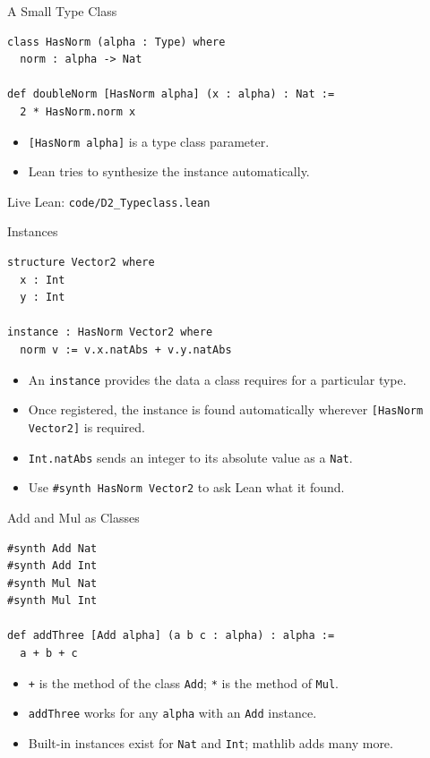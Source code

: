 ﻿\documentclass[aspectratio=169,11pt]{beamer}
\newcommand{\leanfile}[1]{\vfill{\small\color{gray}Live Lean: \texttt{#1}}}
\begin{document}
\begin{frame}[fragile]{A Small Type Class}
  \begin{lstlisting}
class HasNorm (alpha : Type) where
  norm : alpha -> Nat

def doubleNorm [HasNorm alpha] (x : alpha) : Nat :=
  2 * HasNorm.norm x
  \end{lstlisting}

  \begin{itemize}
    \item \texttt{[HasNorm alpha]} is a type class parameter.
    \item Lean tries to synthesize the instance automatically.
  \end{itemize}

  \leanfile{code/D2\_Typeclass.lean}
\end{frame}

\begin{frame}[fragile]{Instances}
  \begin{lstlisting}
structure Vector2 where
  x : Int
  y : Int

instance : HasNorm Vector2 where
  norm v := v.x.natAbs + v.y.natAbs
  \end{lstlisting}

  \begin{itemize}
    \item An \texttt{instance} provides the data a class requires for a particular type.
    \item Once registered, the instance is found automatically wherever \texttt{[HasNorm Vector2]} is required.
    \item \texttt{Int.natAbs} sends an integer to its absolute value as a \texttt{Nat}.
    \item Use \texttt{\#synth HasNorm Vector2} to ask Lean what it found.
  \end{itemize}
\end{frame}

\begin{frame}[fragile]{Add and Mul as Classes}
  \begin{lstlisting}
#synth Add Nat
#synth Add Int
#synth Mul Nat
#synth Mul Int

def addThree [Add alpha] (a b c : alpha) : alpha :=
  a + b + c
  \end{lstlisting}

  \begin{itemize}
    \item \texttt{+} is the method of the class \texttt{Add}; \texttt{*} is the method of \texttt{Mul}.
    \item \texttt{addThree} works for any \texttt{alpha} with an \texttt{Add} instance.
    \item Built-in instances exist for \texttt{Nat} and \texttt{Int}; mathlib adds many more.
  \end{itemize}
\end{frame}
\end{document}
